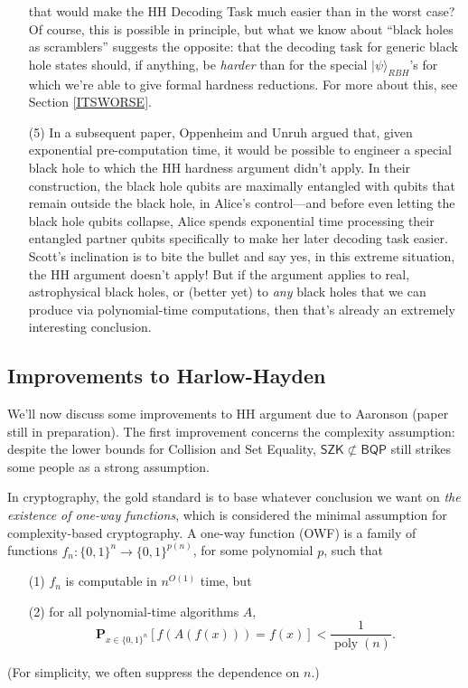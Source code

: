 \documentclass[12pt]{report}
\theoremstyle{plain}
\theoremstyle{definition}
\renewcommand{\Pr}{\mathbf{P}}
\renewcommand{\ket}[1]{|#1\rangle}
\begin{document}
\begin{enumerate}
        that would make the HH Decoding Task much easier than in the worst case?  Of course, this is possible in principle, but what we know about ``black holes as scramblers'' suggests the opposite: that the decoding task for generic black hole states should, if anything, be {\em harder} than for the special $\ket{\psi}_{RBH}$'s for which we're able to give
        formal hardness reductions.  For more about this, see Section \ref{ITSWORSE}.
\item[(5)] In a subsequent paper, Oppenheim and Unruh \cite{OU14} argued that, given exponential pre-computation time, it would be possible to engineer a special black hole to which the HH hardness argument didn't apply.  In their construction, the black hole qubits are maximally entangled with qubits that remain outside the black hole, in Alice's control---and before even letting the black hole qubits collapse, Alice spends exponential time processing their entangled partner qubits specifically to make her later decoding task easier.  Scott's inclination is to bite the bullet and say yes, in this extreme situation, the HH argument doesn't apply!  But if the argument applies to real, astrophysical black holes, or (better yet) to {\em any} black holes that we can produce via polynomial-time computations, then that's already an extremely interesting conclusion.
\end{enumerate}

\subsection{Improvements to Harlow-Hayden}

We'll now discuss some improvements to HH argument due to Aaronson (paper still in preparation).  The first improvement concerns the complexity assumption: despite the lower bounds for Collision and Set Equality, $\mathsf{SZK}\not\subset \mathsf{BQP}$ still strikes some people as a strong assumption.

In cryptography, the gold standard is to base whatever conclusion we want on {\em the existence of one-way functions}, which is considered the minimal assumption for complexity-based cryptography.  A one-way function (OWF) is a family of functions $f_n:\{0,1\}^n\longrightarrow \{0,1\}^{p(n)}$, for some polynomial $p$, such that
\begin{enumerate}
\item[(1)] $f_n$ is computable in $n^{O(1)}$ time, but
\item[(2)] for all polynomial-time algorithms $A$,
$$ \Pr_{x\in \{0,1\}^n}[f(A(f(x)))=f(x)]<\frac{1}{\operatorname*{poly}(n)}. $$
\end{enumerate}
(For simplicity, we often suppress the dependence on $n$.)
\end{document}
